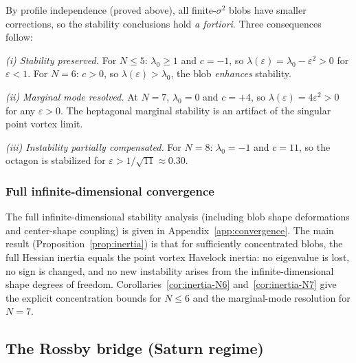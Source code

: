 By profile independence (proved above), all
finite-$\sigma^2$ blobs have smaller corrections,
so the stability conclusions hold \emph{a fortiori}.
Three consequences follow:

\emph{(i) Stability preserved.}  For $N \le 5$:
$\lambda_0 \ge 1$ and $c = -1$, so
$\lambda(\varepsilon) = \lambda_0 - \varepsilon^2 > 0$
for $\varepsilon < 1$.
For $N = 6$: $c > 0$, so $\lambda(\varepsilon) > \lambda_0$, the blob \emph{enhances} stability.

\emph{(ii) Marginal mode resolved.}  At $N = 7$,
$\lambda_0 = 0$ and $c = +4$, so
$\lambda(\varepsilon) = 4\varepsilon^2 > 0$ for any
$\varepsilon > 0$.  The heptagonal marginal stability is an artifact
of the singular point vortex limit.

\emph{(iii) Instability partially compensated.}  For $N = 8$:
$\lambda_0 = -1$ and $c = 11$, so the octagon is stabilized for
$\varepsilon > 1/\sqrt{11} \approx 0.30$.

\subsubsection{Full infinite-dimensional convergence}

The full infinite-dimensional stability analysis (including blob shape
deformations and center-shape coupling) is given in
Appendix~\ref{app:convergence}.  The main result
(Proposition~\ref{prop:inertia}) is that for sufficiently concentrated
blobs, the full Hessian inertia equals the point vortex Havelock inertia:
no eigenvalue is lost, no sign is changed, and no new instability arises
from the infinite-dimensional shape degrees of freedom.
Corollaries~\ref{cor:inertia-N6} and~\ref{cor:inertia-N7} give the
explicit concentration bounds for $N \le 6$ and the marginal-mode
resolution for $N = 7$.

\subsection{The Rossby bridge (Saturn regime)}
\label{sec:rossby-bridge}

